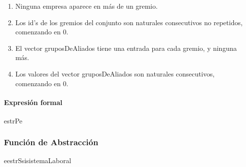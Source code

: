 \begin{enumerate}
	\item Ninguna empresa aparece en m\'as de un gremio.
	\item Los id's de los gremios del conjunto son naturales consecutivos no repetidos, comenzando en 0.
	\item El vector gruposDeAliados tiene una entrada para cada gremio, y ninguna m\'as.
	\item Los valores del vector gruposDeAliados son naturales consecutivos, comenzando en 0.
\end{enumerate}

\paragraph{Expresi\'on formal \\}
\begin{RepFormal}{estrP}{e}
\end{RepFormal}

\subsubsection{Funci\'on de Abstracci\'on}

\begin{FunAbsDescriptiva}{e}{estrS}{si}{sistemaLaboral}



\end{FunAbsDescriptiva}

